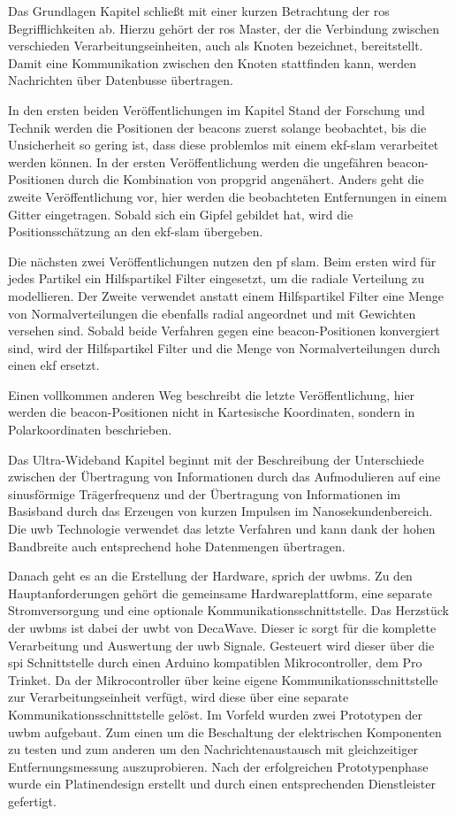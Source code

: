 Das Grundlagen Kapitel schließt mit einer kurzen Betrachtung der \gls{ros} Begrifflichkeiten ab. Hierzu gehört der \gls{ros} Master, der die Verbindung zwischen verschieden Verarbeitungseinheiten, auch als Knoten bezeichnet, bereitstellt. Damit eine Kommunikation zwischen den Knoten stattfinden kann, werden Nachrichten über Datenbusse übertragen.

In den ersten beiden Veröffentlichungen im Kapitel Stand der Forschung und Technik werden die Positionen der \glspl{beacon} zuerst solange beobachtet, bis die Unsicherheit so gering ist, dass diese problemlos mit einem \gls{ekf}-\gls{slam} verarbeitet werden können. In der ersten Veröffentlichung werden die ungefähren \gls{beacon}-Positionen durch die Kombination von \gls{propgrid} angenähert. Anders geht die zweite Veröffentlichung vor, hier werden die beobachteten Entfernungen in einem Gitter eingetragen. Sobald sich ein Gipfel gebildet hat, wird die Positionsschätzung an den \gls{ekf}-\gls{slam} übergeben.

Die nächsten zwei Veröffentlichungen nutzen den \gls{pf} \gls{slam}. Beim ersten wird für jedes Partikel ein Hilfspartikel Filter eingesetzt, um die radiale Verteilung zu modellieren. Der Zweite verwendet anstatt einem Hilfspartikel Filter eine Menge von Normalverteilungen die ebenfalls radial angeordnet und mit Gewichten versehen sind. Sobald beide Verfahren gegen eine \gls{beacon}-Positionen konvergiert sind, wird der Hilfspartikel Filter und die Menge von Normalverteilungen durch einen \gls{ekf} ersetzt.

Einen vollkommen anderen Weg beschreibt die letzte Veröffentlichung, hier werden die \gls{beacon}-Positionen nicht in Kartesische Koordinaten, sondern in Polarkoordinaten beschrieben.

Das Ultra-Wideband Kapitel beginnt mit der Beschreibung der Unterschiede zwischen der Übertragung von Informationen durch das Aufmodulieren auf eine sinusförmige Trägerfrequenz und der Übertragung von Informationen im Basisband durch das Erzeugen von kurzen Impulsen im Nanosekundenbereich. Die \gls{uwb} Technologie verwendet das letzte Verfahren und kann dank der hohen Bandbreite auch entsprechend hohe Datenmengen übertragen.

Danach geht es an die Erstellung der Hardware, sprich der \glspl{uwbm}. Zu den Hauptanforderungen gehört die gemeinsame Hardwareplattform, eine separate Stromversorgung und eine optionale Kommunikationsschnittstelle. Das Herzstück der \glspl{uwbm} ist dabei der \gls{uwbt} von DecaWave. Dieser \gls{ic} sorgt für die komplette Verarbeitung und Auswertung der \gls{uwb} Signale. Gesteuert wird dieser über die \gls{spi} Schnittstelle durch einen Arduino kompatiblen Mikrocontroller, dem Pro Trinket. Da der Mikrocontroller über keine eigene Kommunikationsschnittstelle zur Verarbeitungseinheit verfügt, wird diese über eine separate Kommunikationsschnittstelle gelöst. Im Vorfeld wurden zwei Prototypen der \gls{uwbm} aufgebaut. Zum einen um die Beschaltung der elektrischen Komponenten zu testen und zum anderen um den Nachrichtenaustausch mit gleichzeitiger Entfernungsmessung auszuprobieren. Nach der erfolgreichen Prototypenphase wurde ein Platinendesign erstellt und durch einen entsprechenden Dienstleister gefertigt.

